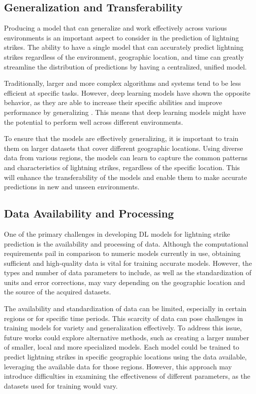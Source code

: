 \subsection{Generalization and Transferability}

Producing a model that can generalize and work effectively across various environments is an important aspect to consider in the prediction of lightning strikes. The ability to have a single model that can accurately predict lightning strikes regardless of the environment, geographic location, and time can greatly streamline the distribution of predictions by having a centralized, unified model.

Traditionally, larger and more complex algorithms and systems tend to be less efficient at specific tasks. However, deep learning models have shown the opposite behavior, as they are able to increase their specific abilities and improve performance by generalizing \cite{whisper-generalization}. This means that deep learning models might have the potential to perform well across different environments.

To ensure that the models are effectively generalizing, it is important to train them on larger datasets that cover different geographic locations. Using diverse data from various regions, the models can learn to capture the common patterns and characteristics of lightning strikes, regardless of the specific location. This will enhance the transferability of the models and enable them to make accurate predictions in new and unseen environments.

\subsection{Data Availability and Processing}

One of the primary challenges in developing DL models for lightning strike prediction is the availability and processing of data. Although the computational requirements pail in comparison to numeric models currently in use, obtaining sufficient and high-quality data is vital for training accurate models. However, the types and number of data parameters to include, as well as the standardization of units and error corrections, may vary depending on the geographic location and the source of the acquired datasets.

The availability and standardization of data can be limited, especially in certain regions or for specific time periods. This scarcity of data can pose challenges in training models for variety and generalization effectively. To address this issue, future works could explore alternative methods, such as creating a larger number of smaller, local and more specialized models. Each model could be trained to predict lightning strikes in specific geographic locations using the data available, leveraging the available data for those regions. However, this approach may introduce difficulties in examining the effectiveness of different parameters, as the datasets used for training would vary.

